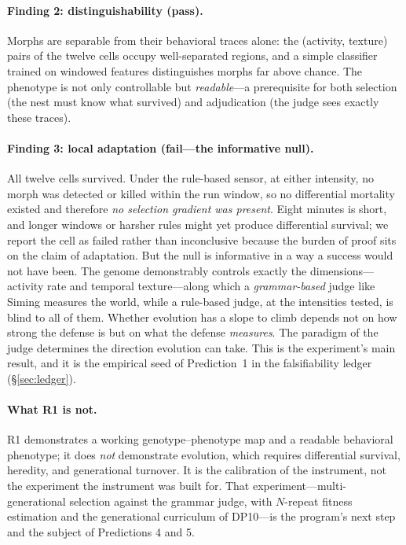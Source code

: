 \documentclass[11pt,a4paper]{article}
\begin{document}
\paragraph{Finding 2: distinguishability (pass).} Morphs are separable from their behavioral traces alone: the (activity, texture) pairs of the twelve cells occupy well-separated regions, and a simple classifier trained on windowed features distinguishes morphs far above chance. The phenotype is not only controllable but \emph{readable}---a prerequisite for both selection (the nest must know what survived) and adjudication (the judge sees exactly these traces).

\paragraph{Finding 3: local adaptation (fail---the informative null).} All twelve cells survived. Under the rule-based sensor, at either intensity, no morph was detected or killed within the run window, so no differential mortality existed and therefore \emph{no selection gradient was present}. Eight minutes is short, and longer windows or harsher rules might yet produce differential survival; we report the cell as failed rather than inconclusive because the burden of proof sits on the claim of adaptation. But the null is informative in a way a success would not have been. The genome demonstrably controls exactly the dimensions---activity rate and temporal texture---along which a \emph{grammar-based} judge like Siming measures the world, while a rule-based judge, at the intensities tested, is blind to all of them. Whether evolution has a slope to climb depends not on how strong the defense is but on what the defense \emph{measures}. The paradigm of the judge determines the direction evolution can take. This is the experiment's main result, and it is the empirical seed of Prediction~1 in the falsifiability ledger (\S\ref{sec:ledger}).

\paragraph{What R1 is not.} R1 demonstrates a working genotype--phenotype map and a readable behavioral phenotype; it does \emph{not} demonstrate evolution, which requires differential survival, heredity, and generational turnover. It is the calibration of the instrument, not the experiment the instrument was built for. That experiment---multi-generational selection against the grammar judge, with $N$-repeat fitness estimation and the generational curriculum of DP10---is the program's next step and the subject of Predictions 4 and 5.
\end{document}
